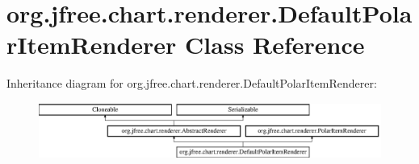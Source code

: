 \hypertarget{classorg_1_1jfree_1_1chart_1_1renderer_1_1_default_polar_item_renderer}{}\section{org.\+jfree.\+chart.\+renderer.\+Default\+Polar\+Item\+Renderer Class Reference}
\label{classorg_1_1jfree_1_1chart_1_1renderer_1_1_default_polar_item_renderer}
Inheritance diagram for org.\+jfree.\+chart.\+renderer.\+Default\+Polar\+Item\+Renderer\+:\begin{figure}[H]
\begin{center}
\leavevmode
\includegraphics[height=1.836066cm]{classorg_1_1jfree_1_1chart_1_1renderer_1_1_default_polar_item_renderer}
\end{center}
\end{figure}
